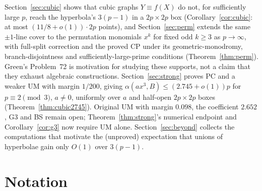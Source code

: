 \documentclass[11pt]{article}
\theoremstyle{remark}
\begin{document}
Section~\ref{sec:cubic} shows that cubic graphs $Y\equiv f(X)$ do not, for sufficiently large $p$, reach the hyperbola's $3(p-1)$ in a $2p\times2p$ box
(Corollary~\ref{cor:cubic}: at most $(11/8+o(1))\cdot2p$ points), and Section~\ref{sec:perm} extends the same $\pm1$-line cover to the
permutation monomials $x^k$ for fixed odd $k\ge3$ as $p\to\infty$, with full-split correction and the proved CP under its geometric-monodromy, branch-disjointness and sufficiently-large-prime conditions
(Theorem~\ref{thm:perm}).  Green's Problem~72 \cite{Green} is motivation for studying these supports, not a claim that they exhaust algebraic constructions.
Section~\ref{sec:strong} proves PC and a weaker UM with margin $1/200$, giving
$\alpha(ax^3,B)\le(2.745+o(1))p$ for $p\equiv2\pmod3$, $a\ne0$, uniformly over $a$ and half-open $2p\times2p$ boxes
(Theorem~\ref{thm:cubic2745}).  Original UM with margin $0.098$, the coefficient $2.652$, G3 and BS remain open;
Theorem~\ref{thm:strong}'s numerical endpoint and Corollary~\ref{cor:g3} now require UM alone.  Section~\ref{sec:beyond} collects the computations that motivate the (unproved)
expectation that unions of hyperbolae gain only $O(1)$ over $3(p-1)$.

\section{Notation}
\end{document}
